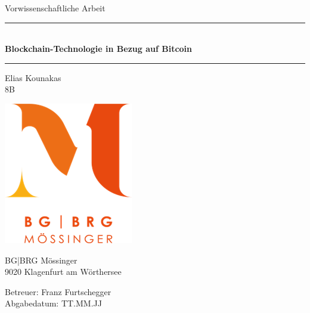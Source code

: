 

\begin{titlepage}
  \begin{center}
    \vspace*{-4cm}
    Vorwissenschaftliche Arbeit
    \vspace{1cm}

    \rule{440pt}{0.1pt}\\
    \vspace{0.5cm}
    \textbf{\Huge Blockchain-Technologie in Bezug auf Bitcoin}\\
    \rule{440pt}{0.1pt}

    \large
    \vspace{2cm}
    Elias Kounakas\\
    8B
    \vspace{2cm}

    \includegraphics{images/mossinger-logo.png}

    \vspace{2cm}
    BG|BRG Mössinger\\
    9020 Klagenfurt am Wörthersee
    \vspace{2cm}

    \vfill
    Betreuer: Franz Furtschegger\\
    Abgabedatum: TT.MM.JJ
    \vspace*{-5cm}
    \end{center}
\end{titlepage}